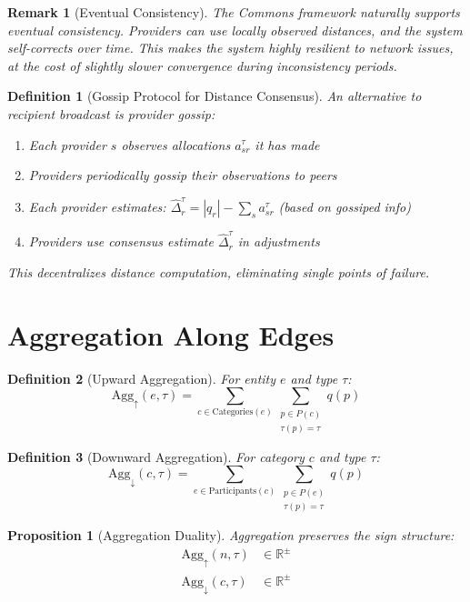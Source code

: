 \documentclass[11pt]{article}
\newtheorem{definition}{Definition}
\newtheorem{proposition}{Proposition}
\newtheorem{remark}{Remark}
\begin{document}
\begin{remark}[Eventual Consistency]
The Commons framework naturally supports eventual consistency. Providers can use locally observed distances, and the system self-corrects over time. This makes the system highly resilient to network issues, at the cost of slightly slower convergence during inconsistency periods.
\end{remark}

\begin{definition}[Gossip Protocol for Distance Consensus]
An alternative to recipient broadcast is provider gossip:
\begin{enumerate}
\item Each provider $s$ observes allocations $a_{sr}^\tau$ it has made
\item Providers periodically gossip their observations to peers
\item Each provider estimates: $\hat{\Delta}_r^\tau = |q_r| - \sum_s a_{sr}^\tau$ (based on gossiped info)
\item Providers use consensus estimate $\hat{\Delta}_r^\tau$ in adjustments
\end{enumerate}

This decentralizes distance computation, eliminating single points of failure.
\end{definition}

\section{Aggregation Along Edges}

\begin{definition}[Upward Aggregation]
For entity $e$ and type $\tau$:
\[
\text{Agg}_\uparrow(e, \tau) = \sum_{c \in \text{Categories}(e)} \sum_{\substack{p \in P(c) \\ \tau(p) = \tau}} q(p)
\]
\end{definition}

\begin{definition}[Downward Aggregation]
For category $c$ and type $\tau$:
\[
\text{Agg}_\downarrow(c, \tau) = \sum_{e \in \text{Participants}(c)} \sum_{\substack{p \in P(e) \\ \tau(p) = \tau}} q(p)
\]
\end{definition}

\begin{proposition}[Aggregation Duality]
Aggregation preserves the sign structure:
\begin{align}
\text{Agg}_\uparrow(n, \tau) &\in \mathbb{R}^\pm \\
\text{Agg}_\downarrow(c, \tau) &\in \mathbb{R}^\pm
\end{align}
\end{proposition}
\end{document}
